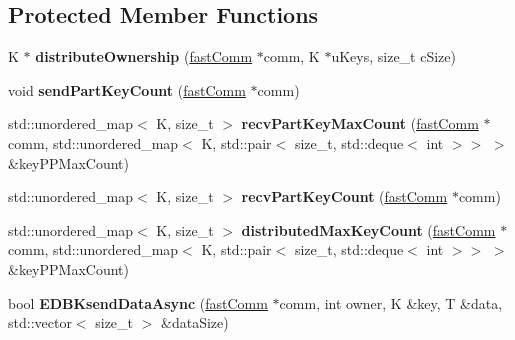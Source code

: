 \subsection*{Protected Member Functions}
\begin{DoxyCompactItemize}
\item 
\hypertarget{classfaster_1_1workerIFddCore_a26fb895202e4047b8e82794719bb0eaa}{}\label{classfaster_1_1workerIFddCore_a26fb895202e4047b8e82794719bb0eaa} 
K $\ast$ {\bfseries distribute\+Ownership} (\hyperlink{classfaster_1_1fastComm}{fast\+Comm} $\ast$comm, K $\ast$u\+Keys, size\+\_\+t c\+Size)
\item 
\hypertarget{classfaster_1_1workerIFddCore_a160215ff486742aa4795e90e71cd8f0e}{}\label{classfaster_1_1workerIFddCore_a160215ff486742aa4795e90e71cd8f0e} 
void {\bfseries send\+Part\+Key\+Count} (\hyperlink{classfaster_1_1fastComm}{fast\+Comm} $\ast$comm)
\item 
\hypertarget{classfaster_1_1workerIFddCore_af5fdb0b95a8029bbe6b588fb7be45c07}{}\label{classfaster_1_1workerIFddCore_af5fdb0b95a8029bbe6b588fb7be45c07} 
std\+::unordered\+\_\+map$<$ K, size\+\_\+t $>$ {\bfseries recv\+Part\+Key\+Max\+Count} (\hyperlink{classfaster_1_1fastComm}{fast\+Comm} $\ast$comm, std\+::unordered\+\_\+map$<$ K, std\+::pair$<$ size\+\_\+t, std\+::deque$<$ int $>$$>$ $>$ \&key\+P\+P\+Max\+Count)
\item 
\hypertarget{classfaster_1_1workerIFddCore_a5b87c56a369a077ad1b194359f8a73bc}{}\label{classfaster_1_1workerIFddCore_a5b87c56a369a077ad1b194359f8a73bc} 
std\+::unordered\+\_\+map$<$ K, size\+\_\+t $>$ {\bfseries recv\+Part\+Key\+Count} (\hyperlink{classfaster_1_1fastComm}{fast\+Comm} $\ast$comm)
\item 
\hypertarget{classfaster_1_1workerIFddCore_ac15047cf51618a15489993fe3a263837}{}\label{classfaster_1_1workerIFddCore_ac15047cf51618a15489993fe3a263837} 
std\+::unordered\+\_\+map$<$ K, size\+\_\+t $>$ {\bfseries distributed\+Max\+Key\+Count} (\hyperlink{classfaster_1_1fastComm}{fast\+Comm} $\ast$comm, std\+::unordered\+\_\+map$<$ K, std\+::pair$<$ size\+\_\+t, std\+::deque$<$ int $>$$>$ $>$ \&key\+P\+P\+Max\+Count)
\item 
\hypertarget{classfaster_1_1workerIFddCore_aed9530ac6f0a92065d299f15a4a138af}{}\label{classfaster_1_1workerIFddCore_aed9530ac6f0a92065d299f15a4a138af} 
bool {\bfseries E\+D\+B\+Ksend\+Data\+Async} (\hyperlink{classfaster_1_1fastComm}{fast\+Comm} $\ast$comm, int owner, K \&key, T \&data, std\+::vector$<$ size\+\_\+t $>$ \&data\+Size)
\item 

\end{DoxyCompactItemize}
